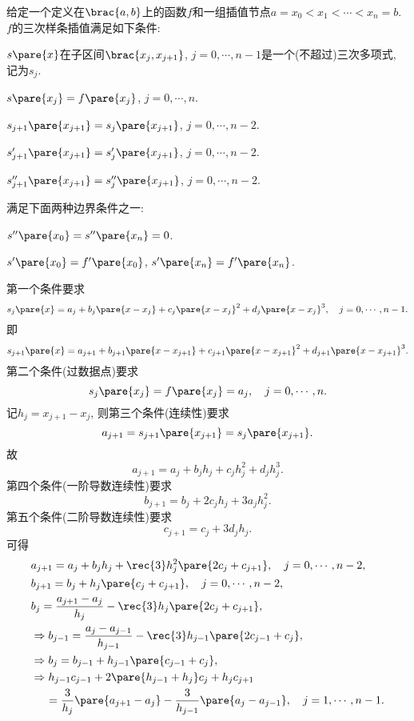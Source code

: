\documentclass[hidelinks]{ctexart}
\begin{document}
\begin{definition}
    给定一个定义在$\brac{a,b}$上的函数$f$和一组插值节点$a = x_0 < x_1<\cdots < x_n = b$. $f$的三次样条插值满足如下条件:
    \begin{cenum}
        \item $s\pare{x}$在子区间$\brac{x_j,x_{j+1}}$, $j = 0,\cdots,n-1$是一个(不超过)三次多项式, 记为$s_j$.
        \item $s\pare{x_j} = f\pare{x_j}$, $j = 0,\cdots,n$.
        \item $s_{j+1}\pare{x_{j+1}} = s_j\pare{x_{j+1}}$, $j = 0,\cdots,n-2$.
        \item $s'_{j+1}\pare{x_{j+1}} = s'_j\pare{x_{j+1}}$, $j = 0,\cdots,n-2$.
        \item $s''_{j+1}\pare{x_{j+1}} = s''_j\pare{x_{j+1}}$, $j = 0,\cdots,n-2$.
        \item 满足下面两种边界条件之一:
        \begin{cenum}
            \item $s''\pare{x_0} = s''\pare{x_n} = 0$.
            \item $s'\pare{x_0} = f'\pare{x_0}$, $s'\pare{x_n} = f'\pare{x_n}$.
        \end{cenum}
    \end{cenum}
\end{definition}
第一个条件要求
\[ s_j\pare{x} = a_j + b_j\pare{x-x_j} + c_j\pare{x-x_j}^2 + d_j\pare{x-x_j}^3,\quad j = 0,\cdots, n - 1. \]
即
\[ s_{j+1}\pare{x} = a_{j+1} + b_{j+1}\pare{x-x_{j+1}} + c_{j+1}\pare{x-x_{j+1}}^2 + d_{j+1}\pare{x-x_{j+1}}^3. \]
第二个条件(过数据点)要求
\[ s_j\pare{x_j} = f\pare{x_j} = a_j,\quad j = 0,\cdots,n. \]
记$h_j = x_{j+1} - x_j$, 则第三个条件(连续性)要求
\[ a_{j+1} = s_{j+1}\pare{x_{j+1}} = s_j\pare{x_{j+1}}. \]
故
\[ a_{j+1} = a_j + b_j h_j + c_j h_j^2 + d_j h_j^3. \]
第四个条件(一阶导数连续性)要求
\[ b_{j+1} = b_j + 2c_j h_j + 3a_j h_j^2. \]
第五个条件(二阶导数连续性)要求
\[ c_{j+1} = c_j + 3d_j h_j. \]
可得
\begin{align*}
    & a_{j+1} = a_j + b_j h_j + \rec{3}h_j^2\pare{2c_j + c_{j+1}}, \quad j = 0,\cdots,n-2, \\
    & b_{j+1} = b_j + h_j \pare{c_j+c_{j+1}},\quad j = 0,\cdots,n-2, \\
    & b_j = \frac{a_{j+1}-a_j}{h_j} - \rec{3}h_j\pare{2c_j + c_{j+1}}, \\
    & \Rightarrow b_{j-1} = \frac{a_j - a_{j-1}}{h_{j-1}} - \rec{3}h_{j-1}\pare{2c_{j-1}+c_j}, \\
    & \Rightarrow b_j = b_{j-1} + h_{j-1}\pare{c_{j-1} + c_j}, \\
    & \Rightarrow h_{j-1} c_{j-1} + 2\pare{h_{j-1} + h_j}c_j + h_j c_{j+1} \\
    & \phantom{\Rightarrow \ }= \frac{3}{h_j}\pare{a_{j+1} - a_j} - \frac{3}{h_{j-1}}\pare{a_j - a_{j-1}},\quad j = 1,\cdots,n-1.
\end{align*}
\end{document}
